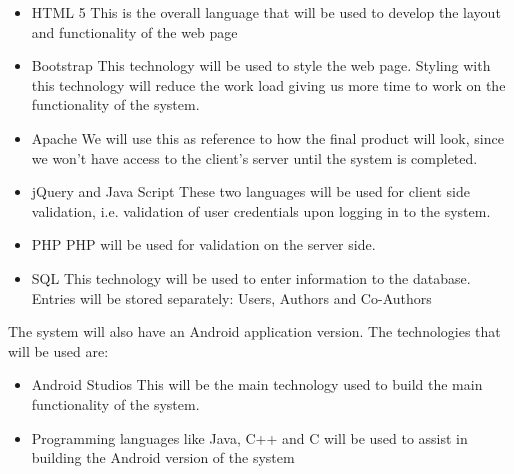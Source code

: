 \documentclass[hidelinks,a4paper,12pt]{article}
\begin{document}
	\begin{itemize} 
		\item HTML 5
		\newline
		This is the overall language that will be used to develop the layout and functionality of the web page
		\item Bootstrap
		\newline
		This technology will be used to style the web page. Styling with this technology will reduce the work load giving us more time to work on the 				functionality of the system.
		\item Apache
		\newline
		We will use this as reference to how the final product will look, since we won’t have access to the client’s server until the system is completed.	
		\item jQuery and Java Script
		\newline
		These two languages will be used for client side validation, i.e. validation of user credentials upon logging in to the system.	
		\item PHP
		\newline
		PHP will be used for validation on the server side.	
		\item SQL
		\newline  
		This technology will be used to enter information to the database. Entries will be stored separately:
		Users,
		Authors and Co-Authors
	\end{itemize}
	
	\begin{flushleft}
		The system will also have an Android application version. The technologies that will be used are:
	\end{flushleft}
	\begin{itemize} 
		\item Android Studios
		\newline
		This will be the main technology used to build the main functionality of the system.
		
		\item Programming languages like Java, C++ and C will be used to assist in building the Android version of the system  
	\end{itemize}		 

 



 
\end{document}

